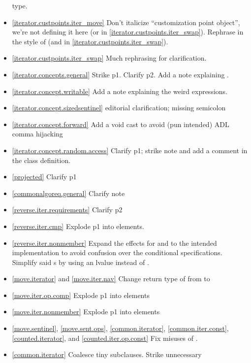 \begin{itemize}
  type.
\item \ref{iterator.custpoints.iter_move} Don't italicize ``customization point
  object'', we're not defining it here
  (or in \ref{iterator.custpoints.iter_swap}). Rephrase in the style of
   (and in
  \ref{iterator.custpoints.iter_swap}).
\item \ref{iterator.custpoints.iter_swap} Much rephrasing for clarification.
\item \ref{iterator.concepts.general} Strike p1. Clarify p2.
  Add a note explaining .
\item \ref{iterator.concept.writable} Add a note explaining the weird
   expressions.
\item \ref{iterator.concept.sizedsentinel} editorial clarification;
  missing semicolon
\item \ref{iterator.concept.forward} Add a void cast to avoid (pun intended) ADL
  comma hijacking
\item \ref{iterator.concept.random.access} Clarify p1; strike note and add a
   comment in the class definition.
\item \ref{projected} Clarify p1
\item \ref{commonalgoreq.general} Clarify note
\item \ref{reverse.iter.requirements} Clarify p2
\item \ref{reverse.iter.cmp} Explode p1 into \constraints elements.
\item \ref{reverse.iter.nonmember} Expand the effects for  and
   to the intended implementation to avoid confusion over the
  conditional  specifications. Simplify said s
  by using an lvalue  instead of .
\item \ref{move.iterator} and \ref{move.iter.nav} Change return type of
   from  to 
\item \ref{move.iter.op.comp} Explode p1 into \constraints elements
\item \ref{move.iter.nonmember} Explode p1 into \constraints elements
\item \ref{move.sentinel}, \ref{move.sent.ops}, \ref{common.iterator},
  \ref{common.iter.const}, \ref{counted.iterator},
  and \ref{counted.iter.op.const} Fix misuses of .
\item \ref{common.iterator} Coalesce tiny subclauses. Strike unnecessary

\end{itemize}
